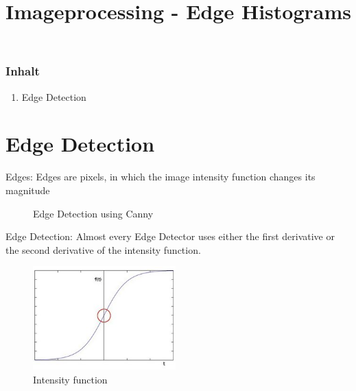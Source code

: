 \documentclass{beamer}
\title{Imageprocessing - Edge Histograms}
\author{}
\date{}
\begin{document}
\begin{frame}
	\frametitle{Inhalt}
	\begin{enumerate}
		\item Edge Detection
	\end{enumerate}
\end{frame}


\section{Edge Detection}
\begin{frame}
		\begin{block}{Edges:}
			Edges are pixels, in which the image intensity function changes its
			magnitude
		\end{block}
	\begin{figure} 
		\caption{Edge Detection using Canny} 
		\end{figure}
\end{frame}

\begin{frame}
	\begin{block}{Edge Detection:}
		Almost every Edge Detector uses either the first derivative or the second derivative of the intensity function. 
	\end{block}
	\begin{figure} 
		\includegraphics[width=0.49\textwidth]{edge3.jpg}
		\caption{Intensity function} 
	\end{figure}
\end{frame}
\end{document}
